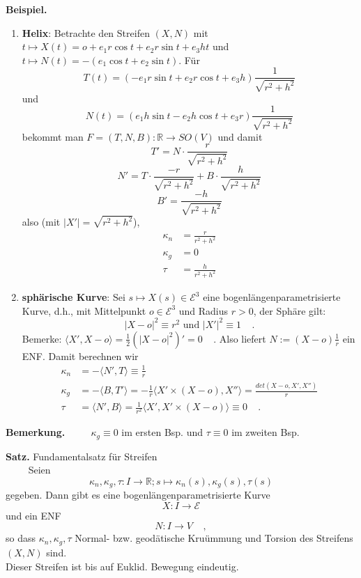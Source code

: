 \documentclass[a4paper,oneside,11pt,DIV=12,parskip=half]{scrartcl}
\newcommand{\R}{\mathbb R}
\newcommand{\E}{\mathcal E}
\newenvironment{note}{\textbf{Bemerkung.} ~~~~}{}
\newenvironment{theorem}[1][]{\textbf{Satz.} #1~~~~}{}
\newenvironment{example}{\textbf{Beispiel.} ~~~~}{}
\newenvironment{lemma, definition}{\textbf{Lemma und Definition.} ~~~~}{}
\newenvironment{note, example}{\textbf{Bemerkung und Beispiel.} ~~~~}{}
\newenvironment{note, definition}{\textbf{Bemerkung und Definition.} ~~~~}{}
\begin{document}
\begin{example}
	\begin{enumerate}
		 \item \textbf {Helix}: Betrachte den Streifen $(X,N)$ mit $t \mapsto X(t) = o + e_1r\cos t + e_2r \sin t + e_3ht$ und 
		$t \mapsto N(t) = -(e_1\cos t + e_2 \sin t)$.
		Für $$T(t) = (-e_1r\sin t + e_2r \cos t + e_3h) \frac{1}{\sqrt{r^2 + h^2}}$$ und
		$$N(t) = (e_1h\sin t - e_2h \cos t + e_3r) \frac{1}{\sqrt{r^2 + h^2}}$$ bekommt man
		$F = (T,N,B): \R \rightarrow SO(V)$ und damit \[ T' = N \cdot \frac{r}{\sqrt{r^2 + h^2}} \]		\[ N' = T \cdot \frac{-r}{\sqrt{r^2 + h^2}} + B \cdot \frac{h}{\sqrt{r^2 + h^2}} \]	
		\[B'= \frac{-h}{\sqrt{r^2 +h^2}}\]
		also (mit $|X'|=\sqrt{r^2 + h^2}$),
		\begin{align*}
		\kappa_n & = \frac{r}{r^2 + h^2} \\
		\kappa_g & = 0 \\
		\tau & = \frac{h}{r^2+ h^2} 
		\end{align*} 
		
		\item \textbf{sphärische Kurve}: Sei $s\mapsto X(s) \in \E^3$ eine bogenlängenparametrisierte Kurve, d.h., mit Mittelpunkt $o \in \E^3$ und Radius $r>0$, der Sphäre gilt:
		\[ |X-o|^2 \equiv r^2 \text{ und } |X'|^2 \equiv 1 ~~~~~.\]
		Bemerke:
		$\langle X',X-o \rangle = \frac 12 (|X-o|^2)' = 0 ~~~~~.$
		Also liefert $N :=(X-o)\frac 1r $ ein ENF. Damit berechnen wir
		\begin{align*}
			\kappa_n &= - \langle N', T \rangle \equiv \frac 1r\\
			\kappa_g &= - \langle B, T' \rangle = - \frac 1r \langle X' \times (X-o), X'' \rangle = \frac{det(X-o,X',X'')}{r}\\
			\tau &= \langle N',B\rangle = \frac{1}{r^2} \langle X',X'\times (X-o) \rangle \equiv 0 ~~~~~.
			\end{align*}
		 
	\end{enumerate}

\end{example}

\begin{note}
	$\kappa_g \equiv 0$ im ersten Bsp. und $\tau \equiv 0$ im zweiten Bsp.
\end{note}

\begin{theorem}[Fundamentalsatz für Streifen\\]
	Seien $$\kappa_n, \kappa_g, \tau: I \rightarrow \R; s \mapsto \kappa_n(s), \kappa_g(s), \tau(s)$$ gegeben. Dann gibt es eine bogenlängenparametrisierte Kurve $$X: I \rightarrow \E$$ und ein ENF $$N: I \rightarrow V ~~~~~,$$ so dass $\kappa_n, \kappa_g, \tau$ Normal- bzw. geodätische Kruümmung und Torsion des Streifens $(X,N)$ sind.\\ Dieser Streifen ist bis auf Euklid. Bewegung eindeutig.
\end{theorem}
\end{document}
